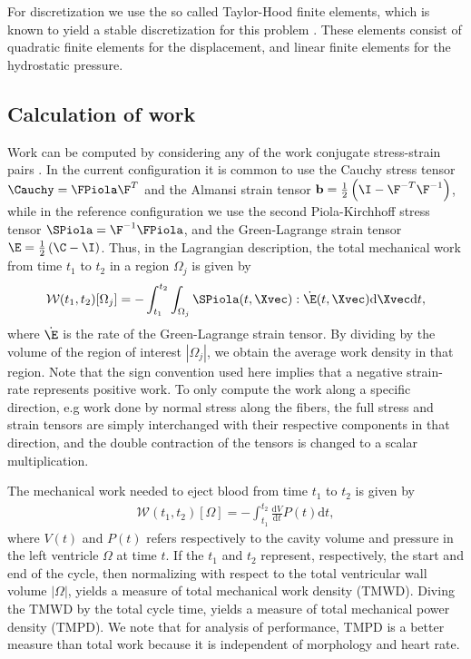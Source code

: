 For discretization we use the so called Taylor-Hood finite elements,
which is known to yield a stable discretization for this problem
\cite{arnold1984stable}. These elements consist of quadratic finite
elements for the displacement, and linear finite elements for
the hydrostatic pressure. 



\subsection{Calculation of work}
\label{sec:regional_work}

Work can be computed by considering any of the
work conjugate stress-strain pairs \cite{holzapfel2000nonlinear}. In
the current configuration it is common to use the Cauchy stress tensor
$\Cauchy = \FPiola \F^T$ and the Almansi strain tensor $\mathbf{b} =
\frac{1}{2} \left(\I -  \F^{-T} \F^{-1} \right)$, while in
the reference configuration we use the second Piola-Kirchhoff stress
tensor $\SPiola = \F^{-1} \FPiola$, and the Green-Lagrange strain
tensor $\E = \frac{1}{2}\left(\C - \I \right)$. Thus, in the Lagrangian
description, the total mechanical work from time $t_1$ to $t_2$ in a
region $\Omega_j$ is given by
\begin{align}
   \mathcal{W}(t_1, t_2)[\Omega_j] = 
  -\int_{t_1}^{t_2} \int_{\Omega_j}\SPiola(t, \Xvec)
  : \dot{\E}(t, \Xvec) \mathrm{d}\Xvec \mathrm{d}t, 
\end{align}
where $ \dot{\E} $ is the rate of the Green-Lagrange strain tensor.
By dividing by the volume of the region of interest $| \Omega_j |$,
we obtain the average work density in that region. Note that the sign
convention used here implies that a negative strain-rate
represents positive work. To only compute the
work along a specific direction, e.g  work done by normal stress along the fibers, the full stress
and strain tensors are simply interchanged with their respective
components in that direction, and the double contraction of the tensors
is changed to a scalar multiplication.

The mechanical work needed to eject blood from time $t_1$ to
$t_2$ is given by
\begin{align}
   \mathcal{W}(t_1, t_2)[\Omega] = 
  -\int_{t_1}^{t_2} \frac{\mathrm{d}V}{\mathrm{d}t} P(t) \mathrm{d}t,
\end{align}
where $V(t)$ and $P(t)$ refers respectively to the cavity volume and pressure in
the left ventricle $\Omega$ at time $t$. If the $t_1$ and $t_2$
represent, respectively, the start and end of the cycle, then normalizing with respect to the
total ventricular wall volume  $| \Omega |$, yields a measure of
total mechanical work density (TMWD). Diving the TMWD by the total
cycle time, yields a measure of total mechanical power
density (TMPD). We note that for analysis of performance, TMPD is
a better measure than total work because it is independent of
morphology and heart rate.  

